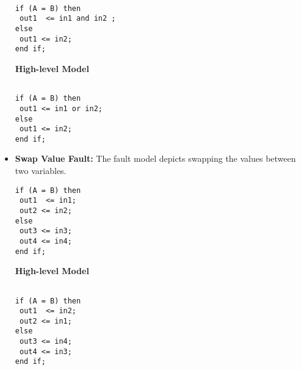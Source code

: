 \begin{itemize}
\begin{lstlisting}[frame=single]  % Start your code-block

if (A = B) then 
 out1  <= in1 and in2 ;
else
 out1 <= in2;
end if;
\end{lstlisting}


\textbf{High-level Model}
\begin{lstlisting}[frame=single]  % Start your code-block

if (A = B) then 
 out1 <= in1 or in2;
else
 out1 <= in2;
end if;
\end{lstlisting}

\item \textbf{Swap Value Fault:} The fault model depicts  swapping the values between two variables.



\begin{lstlisting}[frame=single]  % Start your code-block
if (A = B) then 
 out1  <= in1;
 out2 <= in2;
else
 out3 <= in3;
 out4 <= in4;
end if;
\end{lstlisting}


\textbf{High-level Model}
\begin{lstlisting}[frame=single]  % Start your code-block

if (A = B) then 
 out1  <= in2;
 out2 <= in1;
else
 out3 <= in4;
 out4 <= in3;
end if;
\end{lstlisting}

\end{itemize}

